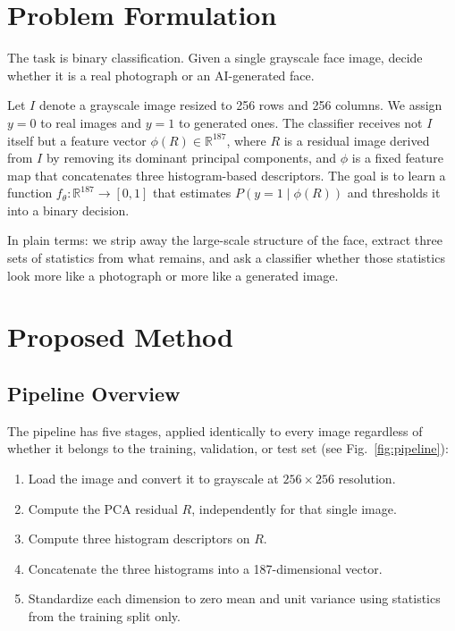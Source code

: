 \documentclass[runningheads]{llncs}
\begin{document}
\section{Problem Formulation}

The task is binary classification. Given a single grayscale face image, decide whether it is a real photograph or an AI-generated face.

Let $I$ denote a grayscale image resized to 256 rows and 256 columns. We assign $y = 0$ to real images and $y = 1$ to generated ones. The classifier receives not $I$ itself but a feature vector $\phi(R) \in \mathbb{R}^{187}$, where $R$ is a residual image derived from $I$ by removing its dominant principal components, and $\phi$ is a fixed feature map that concatenates three histogram-based descriptors. The goal is to learn a function $f_\theta : \mathbb{R}^{187} \to [0,1]$ that estimates $P(y=1 \mid \phi(R))$ and thresholds it into a binary decision.

In plain terms: we strip away the large-scale structure of the face, extract three sets of statistics from what remains, and ask a classifier whether those statistics look more like a photograph or more like a generated image.


\section{Proposed Method}

\subsection{Pipeline Overview}

The pipeline has five stages, applied identically to every image regardless of whether it belongs to the training, validation, or test set (see Fig.~\ref{fig:pipeline}):
\begin{enumerate}
    \item Load the image and convert it to grayscale at $256 \times 256$ resolution.
    \item Compute the PCA residual $R$, independently for that single image.
    \item Compute three histogram descriptors on $R$.
    \item Concatenate the three histograms into a 187-dimensional vector.
    \item Standardize each dimension to zero mean and unit variance using statistics from the training split only.
\end{enumerate}
\end{document}
